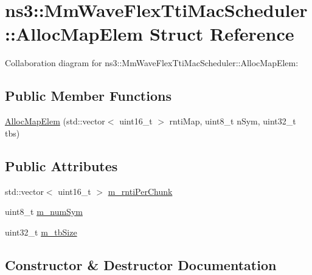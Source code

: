 \hypertarget{structns3_1_1MmWaveFlexTtiMacScheduler_1_1AllocMapElem}{}\section{ns3\+:\+:Mm\+Wave\+Flex\+Tti\+Mac\+Scheduler\+:\+:Alloc\+Map\+Elem Struct Reference}
\label{structns3_1_1MmWaveFlexTtiMacScheduler_1_1AllocMapElem}


Collaboration diagram for ns3\+:\+:Mm\+Wave\+Flex\+Tti\+Mac\+Scheduler\+:\+:Alloc\+Map\+Elem\+:
\subsection*{Public Member Functions}
\begin{DoxyCompactItemize}
\item 
\hyperlink{structns3_1_1MmWaveFlexTtiMacScheduler_1_1AllocMapElem_af8d518393357015b7aa88cb5f00ccc2f}{Alloc\+Map\+Elem} (std\+::vector$<$ uint16\+\_\+t $>$ rnti\+Map, uint8\+\_\+t n\+Sym, uint32\+\_\+t tbs)
\end{DoxyCompactItemize}
\subsection*{Public Attributes}
\begin{DoxyCompactItemize}
\item 
std\+::vector$<$ uint16\+\_\+t $>$ \hyperlink{structns3_1_1MmWaveFlexTtiMacScheduler_1_1AllocMapElem_adb4db6f52be38d2dcdb167c6bb06d8c6}{m\+\_\+rnti\+Per\+Chunk}
\item 
uint8\+\_\+t \hyperlink{structns3_1_1MmWaveFlexTtiMacScheduler_1_1AllocMapElem_afa0127e702c45c3ac7a81dda7618e52a}{m\+\_\+num\+Sym}
\item 
uint32\+\_\+t \hyperlink{structns3_1_1MmWaveFlexTtiMacScheduler_1_1AllocMapElem_ae8b9bd04864d7c1e86668e3ada40bcd0}{m\+\_\+tb\+Size}
\end{DoxyCompactItemize}


\subsection{Constructor \& Destructor Documentation}
